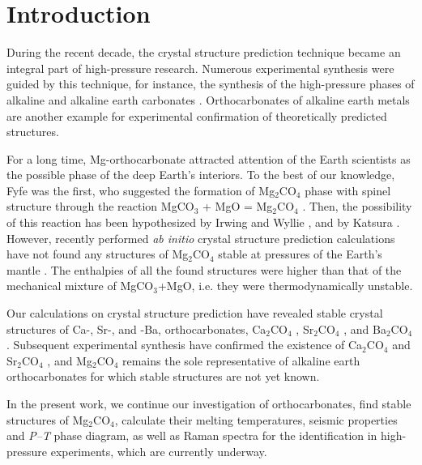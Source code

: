 \documentclass[a4paperm]{article}
\begin{document}
\section*{Introduction}

During the recent decade, the crystal structure prediction technique became an integral part of high-pressure research. 
Numerous experimental synthesis were guided by this technique, for instance, the synthesis of the high-pressure phases of alkaline \cite{gavr2016, gavr2019_alk, grzechnik2003}  and alkaline earth carbonates  \cite{oganov2006, pickard2015, gavr2017_aragII, smith2018, solomatova2017_fedol, binck2020_dol, merlini2017_dol}.
Orthocarbonates of alkaline earth metals are another example for experimental confirmation of theoretically predicted structures.

For a long time, Mg-orthocarbonate attracted attention of the Earth scientists as the possible phase of the deep Earth's interiors.
To the best of our knowledge, Fyfe was the first, who suggested the formation of Mg$_2$CO$_4$ phase  with spinel structure through the reaction MgCO$_3$ + MgO = Mg$_2$CO$_4$  \cite{fyfe1970}.
Then, the possibility of this reaction has been hypothesized by Irwing and Wyllie \cite{irving1973}, and by Katsura \cite{katsura1991_mgco3}.
However, recently performed {\it ab initio} crystal structure prediction calculations have not found any structures of Mg$_2$CO$_4$ stable at pressures of the Earth's mantle \cite{yao2018}.
The enthalpies of all the found structures were higher than that of the mechanical mixture of MgCO$_3$+MgO, i.e. they were thermodynamically unstable.

Our calculations on crystal structure prediction have revealed stable crystal structures of Ca-, Sr-, and -Ba, orthocarbonates, Ca$_2$CO$_4$ \cite{sagatova2020_ortho}, Sr$_2$CO$_4$ \cite{gavr2020_htxrd}, and Ba$_2$CO$_4$ \cite{gavr2020_htxrd}. 
Subsequent experimental synthesis have confirmed the existence of Ca$_2$CO$_4$ and Sr$_2$CO$_4$ \cite{laniel2021_sr2co4,binck2021_ca2co4}, and Mg$_2$CO$_4$ remains the sole representative of alkaline earth orthocarbonates for which stable structures are not yet known.

In the present work, we continue our investigation of orthocarbonates, find stable structures of Mg$_2$CO$_4$, calculate their melting temperatures, seismic properties and {\it P--T} phase diagram, as well as Raman spectra for the identification in high-pressure experiments, which are currently underway.
\end{document}
